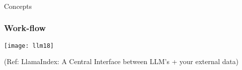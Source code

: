 		



\begin{frame}[fragile]\frametitle{}
\begin{center}
{\Large Concepts}
\end{center}
\end{frame}



\begin{frame}[fragile]\frametitle{Work-flow}

\begin{center}
\texttt{[image: llm18]}

{\tiny (Ref: LlamaIndex: A Central Interface between LLM's + your external data)}
\end{center}
\end{frame}



